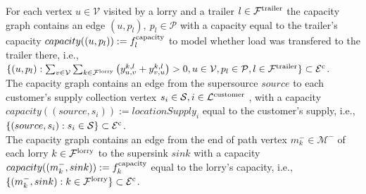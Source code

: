 


For each vertex
$u \in \mathcal V$
visited by a lorry and a trailer
$l \in \mathcal F^{\rm trailer} $
the capacity graph contains an edge
$ (u, p_l), \ p_l \in \mathcal P  $
with a capacity equal to the trailer's capacity
$ capacity((u,p_l)) := f^{\rm capacity}_l$
to model whether load was transfered to the trailer there, i.e.,
$\{ (u,p_l):
\sum_{v \in \mathcal V}\sum_{k \in \mathcal F^{\rm lorry}} 
\left( y^{k,l}_{u,v} + y^{k,l}_{v,u} \right)
> 0,
u \in \mathcal V, p_l \in \mathcal P,  l \in \mathcal F^{\rm trailer} \} \subset \mathcal E^{\rm c}$. \\

The capacity graph  contains an edge from the supersource
$source$
to each customer's supply collection vertex
$s_i \in \mathcal S, i \in \mathcal L^{\rm customer }$ ,
with a capacity
$ capacity((source,s_i)) := locationSupply_{i} $
equal to the customer's supply,
i.e.,
$ \{ (source,s_i): s_i \in \mathcal S\} \subset \mathcal E^{\rm c}$. \\

The capacity graph  contains an edge  from the end of path vertex
$m^-_k \in \mathcal M^-$
of each lorry
$ k \in \mathcal F^{\rm lorry}$
to the supersink
$sink$
with a capacity
$ capacity((m^-_k ,sink)) := f^{\rm capacity}_k $
equal to the lorry's capacity,
i.e.,
$ \{ (m^-_k ,sink): k \in \mathcal F^{\rm lorry}  \} \subset \mathcal E^{\rm c}$. \\


